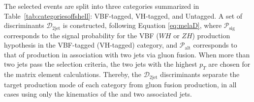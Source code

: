 


The selected events are split into three categories summarized in Table~\ref{tab:categoriesoffshell}: VBF-tagged, VH-tagged, and Untagged.
A set of discriminants $\mathcal{D}_\text{2jet}$ is constructed, following Equation \ref{eq:melaD},
where $\mathcal{P}_\text{sig}$ corresponds to the signal probability for the VBF ($WH$ or $ZH$)
production hypothesis in the VBF-tagged (VH-tagged) category, and $\mathcal{P}_\mathrm{alt}$
corresponds to that of \Hboson production in association with two jets via gluon fusion.
When more than two jets pass the selection criteria, the two jets with the highest $p_T$ are chosen 
for the matrix element calculations. Thereby, the $\mathcal{D}_\text{2jet}$ discriminants separate the 
target production mode of each category from gluon fusion production,
in all cases using only the kinematics of the \Hboson and two associated jets.

